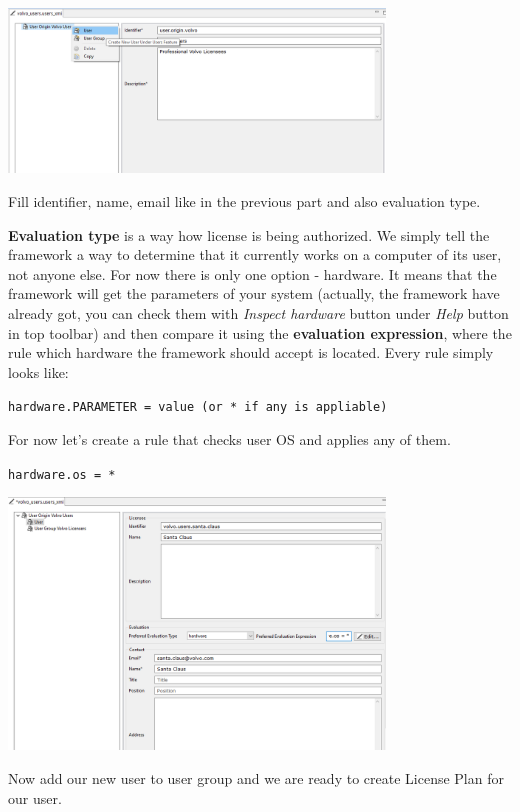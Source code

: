 \documentclass[12pt]{report}
\begin{document}
\begin{center}
    \includegraphics[width=0.75\textwidth]{user_create}
\end{center}

Fill identifier, name, email like in the previous part and also evaluation type.

\textbf{Evaluation type} is a way how license is being authorized. We simply tell the framework a way to determine that it currently works on a computer of its user, not anyone else.
For now there is only one option - hardware. It means that the framework will get the parameters of your system 
(actually, the framework have already got, you can check them with \textit{Inspect hardware} button under \textit{Help} button in top toolbar) and then compare it using the 
\textbf{evaluation expression}, where the rule which hardware the framework should accept is located. Every rule simply looks like:

\verb|hardware.PARAMETER = value (or * if any is appliable)|

For now let's create a rule that checks user OS and applies any of them.

\verb|hardware.os = *|

\begin{center}
    \includegraphics[width=0.75\textwidth]{user_created}
\end{center}

Now add our new user to user group and we are ready to create License Plan for our user.
\end{document}
